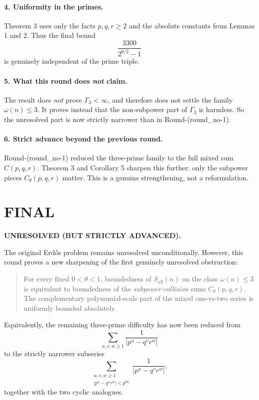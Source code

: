 \paragraph{4. Uniformity in the primes.}
Theorem 3 uses only the facts \(p,q,r\ge 2\) and the absolute constants from Lemmas 1 and 2. Thus the final bound
\[
\frac{3300}{2^{\theta/2}-1}
\]
is genuinely independent of the prime triple.

\paragraph{5. What this round does \emph{not} claim.}
The result does \emph{not} prove \(\Gamma_3<\infty\), and therefore does not settle the family \(\omega(n)\le 3\). It proves instead that the non-subpower part of \(\Gamma_3\) is harmless. So the unresolved part is now strictly narrower than in Round-(round\_no-1).

\paragraph{6. Strict advance beyond the previous round.}
Round-(round\_no-1) reduced the three-prime family to the full mixed sum \(C(p,q,r)\). Theorem 3 and Corollary 5 sharpen this further: only the subpower pieces \(C_\theta(p,q,r)\) matter. This is a genuine strengthening, not a reformulation.

\section{FINAL}

\textbf{UNRESOLVED (BUT STRICTLY ADVANCED).}

The original Erd\H{o}s problem remains unresolved unconditionally. However, this round proves a new sharpening of the first genuinely unresolved obstruction:

\begin{quote}
For every fixed \(0<\theta<1\), boundedness of \(S_{\mathrm{all}}(n)\) on the class \(\omega(n)\le 3\) is equivalent to boundedness of the \emph{subpower-collision} sums \(C_\theta(p,q,r)\). The complementary polynomial-scale part of the mixed one-vs-two series is uniformly bounded absolutely.
\end{quote}

Equivalently, the remaining three-prime difficulty has now been reduced from
\[
\sum_{u,v,w\ge 1}\frac{1}{|p^u-q^v r^w|}
\]
to the strictly narrower subseries
\[
\sum_{\substack{u,v,w\ge 1\\ |p^u-q^v r^w|<p^{\theta u}}}\frac{1}{|p^u-q^v r^w|},
\]
together with the two cyclic analogues.

